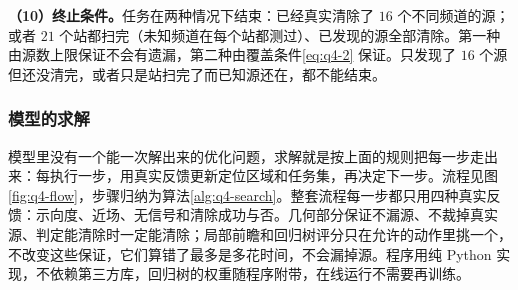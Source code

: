 \begin{center}
\begin{minipage}{\linewidth}
\centering
\QFourTransitFigure
{}
\label{fig:q4-transit}
\end{minipage}
\end{center}

\textbf{（10）终止条件。}任务在两种情况下结束：已经真实清除了 $16$ 个不同频道的源；或者 $21$ 个站都扫完（未知频道在每个站都测过）、已发现的源全部清除。第一种由源数上限保证不会有遗漏，第二种由覆盖条件\eqref{eq:q4-2} 保证。只发现了 $16$ 个源但还没清完，或者只是站扫完了而已知源还在，都不能结束。

\subsubsection{模型的求解}\label{sec:q4-3}

模型里没有一个能一次解出来的优化问题，求解就是按上面的规则把每一步走出来：每执行一步，用真实反馈更新定位区域和任务集，再决定下一步。流程见图\ref{fig:q4-flow}，步骤归纳为算法\ref{alg:q4-search}。整套流程每一步都只用四种真实反馈：示向度、近场、无信号和清除成功与否。几何部分保证不漏源、不裁掉真实源、判定能清除时一定能清除；局部前瞻和回归树评分只在允许的动作里挑一个，不改变这些保证，它们算错了最多是多花时间，不会漏掉源。程序用纯 Python 实现，不依赖第三方库，回归树的权重随程序附带，在线运行不需要再训练。

\begin{center}
\begin{minipage}{\linewidth}
\centering
\QFourFlowFigure
{}
\label{fig:q4-flow}
\end{minipage}
\end{center}

